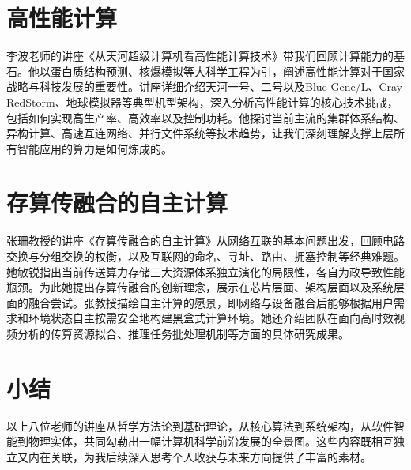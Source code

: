 \section{高性能计算}

李波老师的讲座《从天河超级计算机看高性能计算技术》带我们回顾计算能力的基石。他以蛋白质结构预测、核爆模拟等大科学工程为引，阐述高性能计算对于国家战略与科技发展的重要性。讲座详细介绍天河一号、二号以及Blue Gene/L、Cray RedStorm、地球模拟器等典型机型架构，深入分析高性能计算的核心技术挑战，包括如何实现高生产率、高效率以及控制功耗。他探讨当前主流的集群体系结构、异构计算、高速互连网络、并行文件系统等技术趋势，让我们深刻理解支撑上层所有智能应用的算力是如何炼成的。

\section{存算传融合的自主计算}

张珊教授的讲座《存算传融合的自主计算》从网络互联的基本问题出发，回顾电路交换与分组交换的权衡，以及互联网的命名、寻址、路由、拥塞控制等经典难题。她敏锐指出当前传送算力存储三大资源体系独立演化的局限性，各自为政导致性能瓶颈。为此她提出存算传融合的创新理念，展示在芯片层面、架构层面以及系统层面的融合尝试。张教授描绘自主计算的愿景，即网络与设备融合后能够根据用户需求和环境状态自主按需安全地构建黑盒式计算环境。她还介绍团队在面向高时效视频分析的传算资源拟合、推理任务批处理机制等方面的具体研究成果。

\section{小结}

以上八位老师的讲座从哲学方法论到基础理论，从核心算法到系统架构，从软件智能到物理实体，共同勾勒出一幅计算机科学前沿发展的全景图。这些内容既相互独立又内在关联，为我后续深入思考个人收获与未来方向提供了丰富的素材。